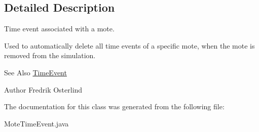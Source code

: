 \subsection{Detailed Description}
Time event associated with a mote.

Used to automatically delete all time events of a specific mote, when the mote is removed from the simulation.

\begin{DoxySeeAlso}{See Also}
\hyperlink{classorg_1_1contikios_1_1cooja_1_1TimeEvent}{Time\-Event} 
\end{DoxySeeAlso}
\begin{DoxyAuthor}{Author}
Fredrik Osterlind 
\end{DoxyAuthor}


The documentation for this class was generated from the following file\-:\begin{DoxyCompactItemize}
\item 
Mote\-Time\-Event.\-java\end{DoxyCompactItemize}
